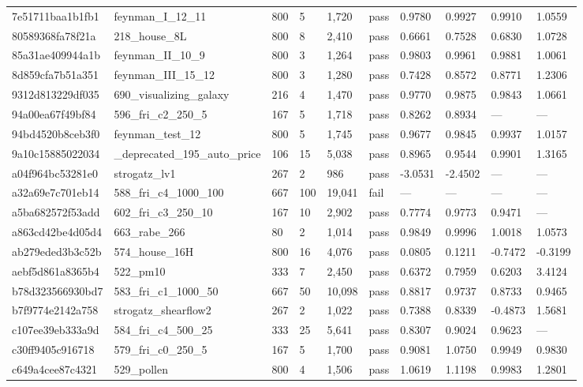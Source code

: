 \begin{longtable}{llllllllll}
7e51711baa1b1fb1 & feynman\_I\_12\_11 & 800 & 5 & 1,720 & pass & 0.9780 & 0.9927 & 0.9910 & 1.0559\\
80589368fa78f21a & 218\_house\_8L & 800 & 8 & 2,410 & pass & 0.6661 & 0.7528 & 0.6830 & 1.0728\\
85a31ae409944a1b & feynman\_II\_10\_9 & 800 & 3 & 1,264 & pass & 0.9803 & 0.9961 & 0.9881 & 1.0061\\
8d859cfa7b51a351 & feynman\_III\_15\_12 & 800 & 3 & 1,280 & pass & 0.7428 & 0.8572 & 0.8771 & 1.2306\\
9312d813229df035 & 690\_visualizing\_galaxy & 216 & 4 & 1,470 & pass & 0.9770 & 0.9875 & 0.9843 & 1.0661\\
94a00ea67f49bf84 & 596\_fri\_c2\_250\_5 & 167 & 5 & 1,718 & pass & 0.8262 & 0.8934 & --- & ---\\
94bd4520b8ceb3f0 & feynman\_test\_12 & 800 & 5 & 1,745 & pass & 0.9677 & 0.9845 & 0.9937 & 1.0157\\
9a10c15885022034 & \_deprecated\_195\_auto\_price & 106 & 15 & 5,038 & pass & 0.8965 & 0.9544 & 0.9901 & 1.3165\\
a04f964bc53281e0 & strogatz\_lv1 & 267 & 2 & 986 & pass & -3.0531 & -2.4502 & --- & ---\\
a32a69e7c701eb14 & 588\_fri\_c4\_1000\_100 & 667 & 100 & 19,041 & fail & --- & --- & --- & ---\\
a5ba682572f53add & 602\_fri\_c3\_250\_10 & 167 & 10 & 2,902 & pass & 0.7774 & 0.9773 & 0.9471 & ---\\
a863cd42be4d05d4 & 663\_rabe\_266 & 80 & 2 & 1,014 & pass & 0.9849 & 0.9996 & 1.0018 & 1.0573\\
ab279eded3b3c52b & 574\_house\_16H & 800 & 16 & 4,076 & pass & 0.0805 & 0.1211 & -0.7472 & -0.3199\\
aebf5d861a8365b4 & 522\_pm10 & 333 & 7 & 2,450 & pass & 0.6372 & 0.7959 & 0.6203 & 3.4124\\
b78d323566930bd7 & 583\_fri\_c1\_1000\_50 & 667 & 50 & 10,098 & pass & 0.8817 & 0.9737 & 0.8733 & 0.9465\\
b7f9774e2142a758 & strogatz\_shearflow2 & 267 & 2 & 1,022 & pass & 0.7388 & 0.8339 & -0.4873 & 1.5681\\
c107ee39eb333a9d & 584\_fri\_c4\_500\_25 & 333 & 25 & 5,641 & pass & 0.8307 & 0.9024 & 0.9623 & ---\\
c30ff9405c916718 & 579\_fri\_c0\_250\_5 & 167 & 5 & 1,700 & pass & 0.9081 & 1.0750 & 0.9949 & 0.9830\\
c649a4cee87c4321 & 529\_pollen & 800 & 4 & 1,506 & pass & 1.0619 & 1.1198 & 0.9983 & 1.2801\\

\end{longtable}
